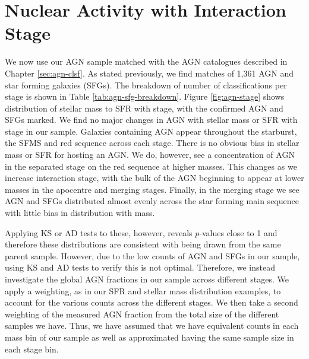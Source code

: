 \section{Nuclear Activity with Interaction Stage}\label{results:AGN_stage}
\noindent We now use our AGN sample matched with the AGN catalogues described in Chapter \ref{sec:agn-clsf}. As stated previously, we find matches of 1,361 AGN and star forming galaxies (SFGs). The breakdown of number of classifications per stage is shown in Table \ref{tab:agn-sfg-breakdown}. Figure \ref{fig:agn-stage} shows distribution of stellar mass to SFR with stage, with the confirmed AGN and SFGs marked. We find no major changes in AGN with stellar mass or SFR with stage in our sample. Galaxies containing AGN appear throughout the starburst, the SFMS and red sequence across each stage. There is no obvious bias in stellar mass or SFR for hosting an AGN. We do, however, see a concentration of AGN in the separated stage on the red sequence at higher masses. This changes as we increase interaction stage, with the bulk of the AGN beginning to appear at lower masses in the apocentre and merging stages. Finally, in the merging stage we see AGN and SFGs distributed almost evenly across the star forming main sequence with little bias in distribution with mass.

Applying KS or AD tests to these, however, reveals $p$-values close to 1 and therefore these distributions are consistent with being drawn from the same parent sample. However, due to the low counts of AGN and SFGs in our sample, using KS and AD tests to verify this is not optimal. Therefore, we instead investigate the global AGN fractions in our sample across different stages. We apply a weighting, as in our SFR and stellar mass distribution examples, to account for the various counts across the different stages. We then take a second weighting of the measured AGN fraction from the total size of the different samples we have. Thus, we have assumed that we have equivalent counts in each mass bin of our sample as well as approximated having the same sample size in each stage bin.

